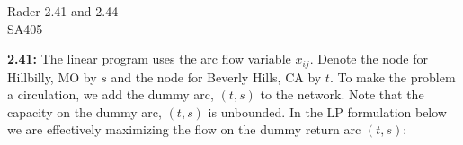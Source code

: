 \documentclass[10pt]{article}
\begin{document}
\begin{center}
  {\sc Rader 2.41 and 2.44}\\
  {\sc SA405} \\
\end{center}

\medskip

\noindent
  \textbf{2.41:} The linear program uses the arc flow variable $x_{ij}$.
    Denote the node for Hillbilly, MO by $s$ and the node for Beverly
    Hills, CA by $t$. To make the problem a circulation, we add the
    dummy arc, $(t,s)$ to the network. Note that the capacity on the dummy arc, $(t,s)$ is unbounded.  In the LP formulation below we are effectively maximizing the flow    on the dummy return arc $(t,s)$:
\end{document}
